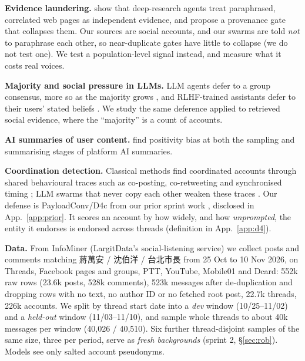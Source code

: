 \documentclass[10pt]{article}
\makeatletter
\renewcommand\section{\@startsection{section}{1}{\z@}{10pt plus 2pt}{4pt}{\normalfont\large\bfseries}}
\newcommand{\ours}{PayloadConv}
\makeatother
\begin{document}
\section{Related Work}
\textbf{Evidence laundering.} \citet{zhou2026laundering} show that deep-research agents treat paraphrased, correlated web pages as independent evidence, and propose a provenance gate that collapses them. Our sources are social accounts, and our swarms are told \emph{not} to paraphrase each other, so near-duplicate gates have little to collapse (we do not test one). We test a population-level signal instead, and measure what it costs real voices.

\textbf{Majority and social pressure in LLMs.} LLM agents defer to a group consensus, more so as the majority grows \citep{weng2025conformity}, and RLHF-trained assistants defer to their users' stated beliefs \citep{sharma2024sycophancy}. We study the same deference applied to retrieved social evidence, where the ``majority'' is a count of accounts.

\textbf{AI summaries of user content.} \citet{liu2026positivity} find positivity bias at both the sampling and summarising stages of platform AI summaries.

\textbf{Coordination detection.} Classical methods find coordinated accounts through shared behavioural traces such as co-posting, co-retweeting and synchronised timing \citep{keller2020astroturfing,pacheco2021coordinated}; LLM swarms that never copy each other weaken these traces \citep{chiu2026payload}. Our defense is \ours/D4c from our prior sprint work \citep{chiu2026payload}, disclosed in App.~\ref{app:prior}. It scores an account by how widely, and how \emph{unprompted}, the entity it endorses is endorsed across threads (definition in App.~\ref{app:d4}).

\section{Methods}
\textbf{Data.} From InfoMiner (LargitData's social-listening service) we collect posts and comments matching 蔣萬安 / 沈伯洋 / 台北市長 from 25 Oct to 10 Nov 2026, on Threads, Facebook pages and groups, PTT, YouTube, Mobile01 and Dcard: 552k raw rows (23.6k posts, 528k comments), 523k messages after de-duplication and dropping rows with no text, no author ID or no fetched root post, 22.7k threads, 226k accounts. We split by thread start date into a \emph{dev} window (10/25--11/02) and a \emph{held-out} window (11/03--11/10), and sample whole threads to about 40k messages per window (40,026 / 40,510). Six further thread-disjoint samples of the same size, three per period, serve as \emph{fresh backgrounds} (sprint 2, \S\ref{sec:rob}). Models see only salted account pseudonyms.
\end{document}
